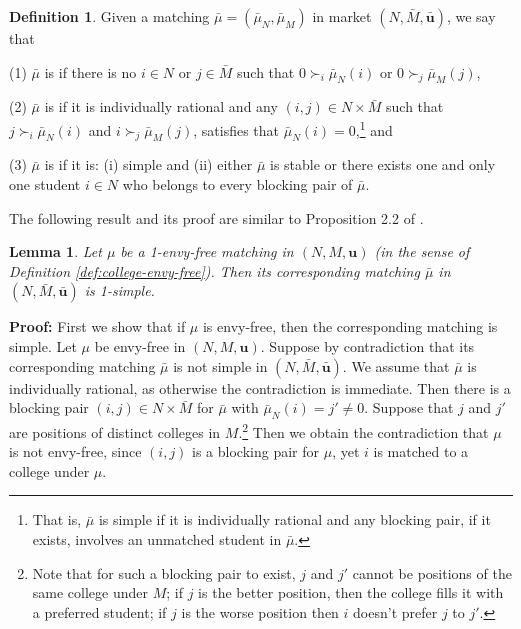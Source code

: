 \documentclass[12pt, fullpage]{amsart}
\newtheorem{lemma}{Lemma}[section]
\theoremstyle{definition}
\newtheorem{definition}{Definition}[section]
\theoremstyle{definition}
\theoremstyle{definition}
\begin{document}
\begin{bibunit}[econometrica]
\begin{definition} Given a matching $\bar{\mu}=(\bar{\mu}_{N},\bar{\mu}_{M})$ in 
	market $(N,\bar{M},\boldsymbol{\bar{u}})$, we say that
	
	(1) $\bar{\mu}$ is  if there is no $i\in N$ or $j\in\bar{M}$ such that $0\succ_{i}\bar{\mu}_{N}(i)$
	or $0\succ_{j}\bar{\mu}_{M}(j)$,
	
	(2) $\bar{\mu}$ is  if it is individually rational and any $(i,j)\in N\times\bar{M}$ such that $j\succ_{i}\bar{\mu}_{N}(i)$
	and $i\succ_{j}\bar{\mu}_{M}(j)$, satisfies that $\bar{\mu}_{N}(i)=0$,\footnote{That is,  $\bar{\mu}$ is simple if it is individually rational and any blocking pair, if it exists, involves an unmatched student in  $\bar{\mu}$.} and
	
	(3) $\bar{\mu}$ is  if it is: (i) simple and (ii) either $\bar{\mu}$ is stable or there exists one and only one student $i\in N$ who belongs to every blocking pair of $\bar{\mu}$.
	\par
\end{definition}\label{def:simple}
The following result and its proof are similar to Proposition 2.2 of \citet{Wu/Roth:2018:GEB}.

\begin{lemma}\label{lem:prop_2pt2_wu_and_roth} Let $\mu$ be a 1-envy-free matching in $(N,M,\boldsymbol{u})$ (in the sense of Definition \ref{def:college-envy-free}). Then its corresponding matching $\bar{\mu}$ in $(N,\bar{M},\boldsymbol{\bar{u}})$ is 1-simple. \end{lemma}

\noindent \textbf{Proof:} First we show that if $\mu$ is envy-free, then the corresponding matching is simple. Let $\mu$ be envy-free in $(N,M,\boldsymbol{u})$. Suppose by contradiction that its corresponding matching $\bar{\mu}$ is not simple in $(N,\bar{M},\boldsymbol{\bar{u}})$. We assume that $\bar{\mu}$ is individually rational, as otherwise the contradiction is immediate. Then there is a blocking pair $(i,j)\in N\times\bar{M}$
for $\bar{\mu}$ with $\bar{\mu}_{N}(i)=j'\neq0$. Suppose that $j$ and $j'$ are positions of distinct colleges in $M$.\footnote{Note that for such a blocking pair to exist, $j$ and $j'$ cannot be positions of the same college under $M$; if $j$ is the better position, then the college fills it with a preferred student; if $j$ is the worse position then $i$ doesn't prefer $j$ to $j'$.} Then we obtain the contradiction that $\mu$ is not envy-free, since $(i,j)$ is a blocking pair for $\mu$, yet $i$ is matched to a college under $\mu$.  


\end{bibunit}
\end{document}
